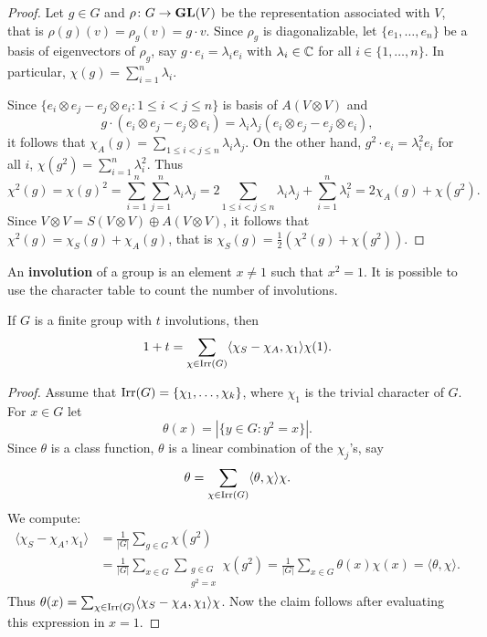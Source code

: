 \begin{proof}
    Let $g\in G$ and $\rho\colon G\to\mathbf{GL}(V)$ be the representation
    associated with $V$, that is $\rho(g)(v)=\rho_g(v)=g\cdot v$. 
    Since $\rho_g$ is diagonalizable, let $\{e_1,\dots,e_n\}$ 
    be a basis of eigenvectors of $\rho_g$, say
    $g\cdot e_i=\lambda_ie_i$ with $\lambda_i\in\mathbb{C}$ for all $i\in\{1,\dots,n\}$. In particular, $\chi(g)=\sum_{i=1}^n\lambda_i$. 
    
    Since $\{e_i\otimes e_j-e_j\otimes e_i:1\leq i<j\leq n\}$ is basis of
    $A(V\otimes V)$ and 
    \[
    g\cdot (e_i\otimes e_j-e_j\otimes e_i)=\lambda_i\lambda_j(e_i\otimes e_j-e_j\otimes e_i),
    \]
    it follows that
    $\chi_A(g)=\sum_{1\leq i<j\leq n}\lambda_i\lambda_j$. On the other hand,
    $g^2\cdot e_i=\lambda_i^2e_i$ for all $i$,
    $\chi(g^2)=\sum_{i=1}^n\lambda_i^2$. Thus 
    \[
    \chi^2(g)=\chi(g)^2=\sum_{i=1}^n\sum_{j=1}^n\lambda_i\lambda_j=2\sum_{1\leq i<j\leq n}\lambda_i\lambda_j+\sum_{i=1}^n\lambda_i^2=2\chi_A(g)+\chi(g^2).
    \]
    Since $V\otimes V=S(V\otimes V)\oplus A(V\otimes V)$, it follows that  
    $\chi^2(g)=\chi_S(g)+\chi_A(g)$, that is 
    $\chi_S(g)=\frac12(\chi^2(g)+\chi(g^2))$.
\end{proof}

An \textbf{involution} of a group is an element $x\ne 1$ such that $x^2=1$. 
It is possible to use the character table to count the number
of involutions.

\begin{proposition}
    If $G$ is a finite group with $t$ involutions, then
    \[
        1+t=\sum_{\chi\in\operatorname{Irr}(G)}\langle\chi_S-\chi_A,\chi_1\rangle\chi(1).
    \]
\end{proposition}

\begin{proof}
    Assume that $\operatorname{Irr}(G)=\{\chi_1,\dots,\chi_k\}$, where $\chi_1$ is 
    the trivial character of $G$. 
    For $x\in G$ let 
    \[
    \theta(x)=|\{y\in G:y^2=x\}|.
    \]
    Since $\theta$ is a class function, 
    $\theta$ is a linear combination of the $\chi_j$'s, say 
    \[
    \theta=\sum_{\chi\in\operatorname{Irr}(G)}\langle\theta,\chi\rangle\chi.
    \]
    We compute: 
    \begin{align*}
        \langle\chi_S-\chi_A,\chi_1\rangle 
        &=\frac{1}{|G|}\sum_{g\in G}\chi(g^2)\\
        &=\frac{1}{|G|}\sum_{x\in G}\sum_{\substack{g\in G\\g^2=x}}\chi(g^2)
        =\frac{1}{|G|}\sum_{x\in G}\theta(x)\chi(x)=\langle\theta,\chi\rangle.
    \end{align*}
    Thus $\theta(x)=\sum_{\chi\in\operatorname{Irr}(G)}\langle\chi_S-\chi_A,\chi_1\rangle\chi$. Now
    the claim follows after evaluating this expression in 
    $x=1$. 
\end{proof}

